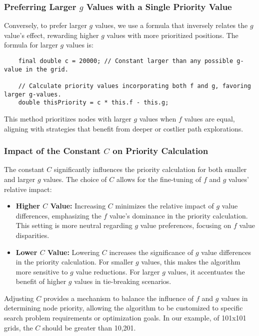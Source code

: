 \documentclass{article}
\begin{document}
\subsubsection{Preferring Larger \(g\) Values with a Single Priority Value}
Conversely, to prefer larger \(g\) values, we use a formula that inversely relates the \(g\) value's effect, rewarding higher \(g\) values with more prioritized positions. The formula for larger \(g\) values is:
\begin{verbatim}
    final double c = 20000; // Constant larger than any possible g-value in the grid.
    
    // Calculate priority values incorporating both f and g, favoring larger g-values.
    double thisPriority = c * this.f - this.g;
\end{verbatim}
This method prioritizes nodes with larger \(g\) values when \(f\) values are equal, aligning with strategies that benefit from deeper or costlier path explorations.

\subsubsection{Impact of the Constant \(C\) on Priority Calculation}
The constant \(C\) significantly influences the priority calculation for both smaller and larger \(g\) values. The choice of \(C\) allows for the fine-tuning of \(f\) and \(g\) values' relative impact:
\begin{itemize}
    \item \textbf{Higher \(C\) Value:} Increasing \(C\) minimizes the relative impact of \(g\) value differences, emphasizing the \(f\) value's dominance in the priority calculation. This setting is more neutral regarding \(g\) value preferences, focusing on \(f\) value disparities.
    \item \textbf{Lower \(C\) Value:} Lowering \(C\) increases the significance of \(g\) value differences in the priority calculation. For smaller \(g\) values, this makes the algorithm more sensitive to \(g\) value reductions. For larger \(g\) values, it accentuates the benefit of higher \(g\) values in tie-breaking scenarios.
\end{itemize}

Adjusting \(C\) provides a mechanism to balance the influence of \(f\) and \(g\) values in determining node priority, allowing the algorithm to be customized to specific search problem requirements or optimization goals. In our example, of 101x101 grids, the \(C\) should be greater than 10,201.
\end{document}
